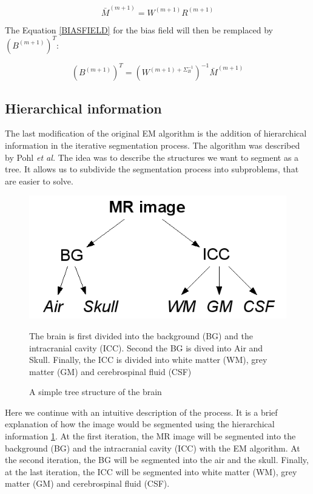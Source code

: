   \begin{equation*}
  \bar{M}^{(m+1)} = W^{(m+1)}R^{(m+1)}
  \end{equation*}

The Equation \ref{BIASFIELD} for the bias field will then be remplaced by $(B^{(m+1)})^T$:

  \begin{equation*}
  (B^{(m+1)})^T = (W^{(m+1) + \Sigma_B^{-1}})^{-1}\bar{M}^{(m+1)}
  \end{equation*}

%
\subsection{Hierarchical information}\label{Structure}
The last modification of the original EM algorithm is the addition of hierarchical information in the iterative segmentation process. The algorithm was described by Pohl \textit{et al.} \cite{11} The idea was to describe the structures we want to segment as a tree. It allows us to subdivide the segmentation process into subproblems, that are easier to solve.
  
  \begin{figure}[ht]\centering
  \includegraphics[width=.4\textwidth]{Images/Graphics/treeStructure.png}
  \caption{A simple tree structure of the brain}{The brain is first divided into the background (BG) and the intracranial cavity (ICC). Second the BG is dived into Air and Skull. Finally, the ICC is divided into white matter (WM), grey matter (GM) and cerebrospinal fluid (CSF)}\label{fig:treeStructure}
  \end{figure}
  
Here we continue with an intuitive description of the process. It is a brief explanation of how the image would be segmented using the hierarchical information  \ref{fig:treeStructure}. At the first iteration, the MR image will be segmented into the background (BG) and the intracranial cavity (ICC) with the EM algorithm. At the second iteration, the BG will be segmented into the air and the skull. Finally, at the last iteration, the ICC will be segmented into white matter (WM), grey matter (GM) and cerebrospinal fluid (CSF).

